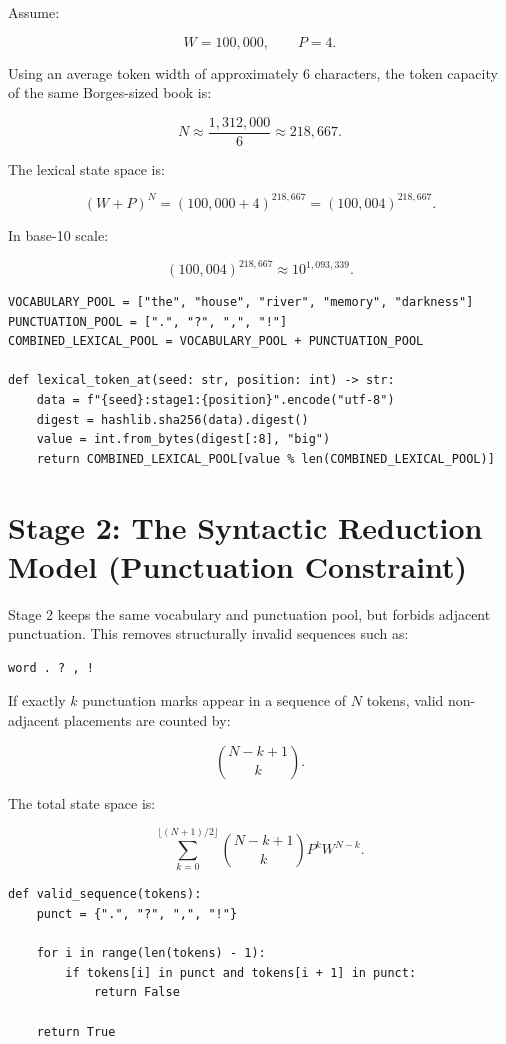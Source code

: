 \documentclass[11pt,a4paper]{article}
\begin{document}
Assume:

\[
W = 100{,}000, \qquad P = 4.
\]

Using an average token width of approximately 6 characters, the token capacity of the same Borges-sized book is:

\[
N \approx \frac{1{,}312{,}000}{6} \approx 218{,}667.
\]

The lexical state space is:

\[
(W+P)^N = (100{,}000 + 4)^{218{,}667} = (100{,}004)^{218{,}667}.
\]

In base-10 scale:

\[
(100{,}004)^{218{,}667} \approx 10^{1{,}093{,}339}.
\]

\begin{lstlisting}[style=pythonstyle]
VOCABULARY_POOL = ["the", "house", "river", "memory", "darkness"]
PUNCTUATION_POOL = [".", "?", ",", "!"]
COMBINED_LEXICAL_POOL = VOCABULARY_POOL + PUNCTUATION_POOL

def lexical_token_at(seed: str, position: int) -> str:
    data = f"{seed}:stage1:{position}".encode("utf-8")
    digest = hashlib.sha256(data).digest()
    value = int.from_bytes(digest[:8], "big")
    return COMBINED_LEXICAL_POOL[value % len(COMBINED_LEXICAL_POOL)]
\end{lstlisting}

\section{Stage 2: The Syntactic Reduction Model (Punctuation Constraint)}

Stage 2 keeps the same vocabulary and punctuation pool, but forbids adjacent punctuation. This removes structurally invalid sequences such as:

\begin{lstlisting}[style=textstyle]
word . ? , !
\end{lstlisting}

If exactly $k$ punctuation marks appear in a sequence of $N$ tokens, valid non-adjacent placements are counted by:

\[
\binom{N-k+1}{k}.
\]

The total state space is:

\[
\sum_{k=0}^{\lfloor(N+1)/2\rfloor}
\binom{N-k+1}{k}
P^k
W^{N-k}.
\]

\begin{lstlisting}[style=pythonstyle]
def valid_sequence(tokens):
    punct = {".", "?", ",", "!"}

    for i in range(len(tokens) - 1):
        if tokens[i] in punct and tokens[i + 1] in punct:
            return False

    return True
\end{lstlisting}
\end{document}
